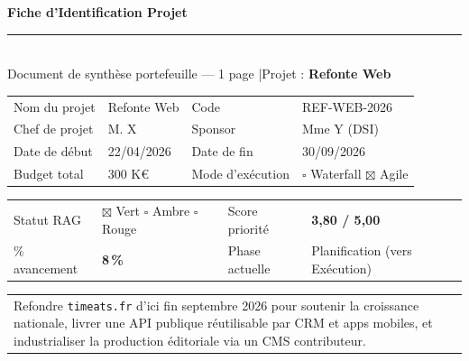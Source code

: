 \documentclass[11pt,a4paper,oneside]{report}
\begin{document}
\small

\noindent\hfill\timeeatslogo

\vspace{-10pt}

\begin{center}
{\LARGE\bfseries\color{cnNavy} Fiche d'Identification Projet}\\[4pt]
\textcolor{cnOrange}{\rule{14cm}{1pt}}\\[4pt]
{\normalsize\color{cnSlate} Document de synthèse portefeuille --- 1 page \quad|\quad Projet : \textbf{Refonte Web}}
\end{center}

\vspace{8pt}

\renewcommand{\arraystretch}{1.5}
\begin{tabularx}{\textwidth}{L{4cm} Y L{4cm} Y}
\toprule
{}
 \\
\midrule
Nom du projet    & Refonte Web              & Code              & REF-WEB-2026 \\
Chef de projet   & M. X                & Sponsor           & Mme Y (DSI) \\
Date de début    & 22/04/2026               & Date de fin       & 30/09/2026 \\
Budget total     & 300 K€                   & Mode d'exécution  & $\square$ Waterfall \quad $\boxtimes$ Agile \\
\bottomrule
\end{tabularx}

\vspace{6pt}

\begin{tabularx}{\textwidth}{L{4cm} Y L{3cm} Y}
\toprule
{}
 \\
\midrule
Statut RAG       & $\boxtimes$ Vert \quad $\square$ Ambre \quad $\square$ Rouge &
Score priorité   & \textbf{3{,}80 / 5{,}00} \\
\% avancement    & \textbf{8\,\%}            & Phase actuelle    & Planification (vers Exécution) \\
\bottomrule
\end{tabularx}

\vspace{6pt}

\begin{tabularx}{\textwidth}{Y}
\toprule
{} \\
\midrule
Refondre \texttt{timeats.fr} d'ici fin septembre 2026 pour soutenir la croissance nationale, livrer une API publique réutilisable par CRM et apps mobiles, et industrialiser la production éditoriale via un CMS contributeur. \\[4pt]
\bottomrule
\end{tabularx}
\end{document}
